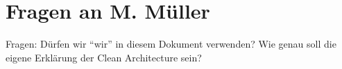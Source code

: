 \newpage
\titlespacing*{\chapter}{0pt}{-30mm}{10pt}
  
\chapter{Fragen an M. Müller}
\pagestyle{scrheadings}
\clearscrheadfoot
{}
\setcounter{page}{9}
\ofoot[\pagemark]{\pagemark}
\onehalfspacing

Fragen: Dürfen wir \enquote{wir} in diesem Dokument verwenden? Wie genau soll die eigene Erklärung der Clean Architecture sein?